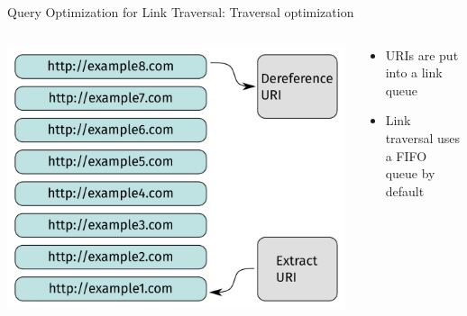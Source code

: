 \begin{frame}{Query Optimization for Link Traversal: Traversal optimization}
    \begin{columns}[T] %
        \begin{column}{0.55\textwidth} %
            \includegraphics[width=.80\linewidth]{images/link-queue.pdf} %
        \end{column}

        \begin{column}{0.4\textwidth}
            \begin{itemize}
                \item URIs are put into a link queue
                \item Link traversal uses a FIFO queue by default
            \end{itemize}
        \end{column}
    \end{columns}
\end{frame}


